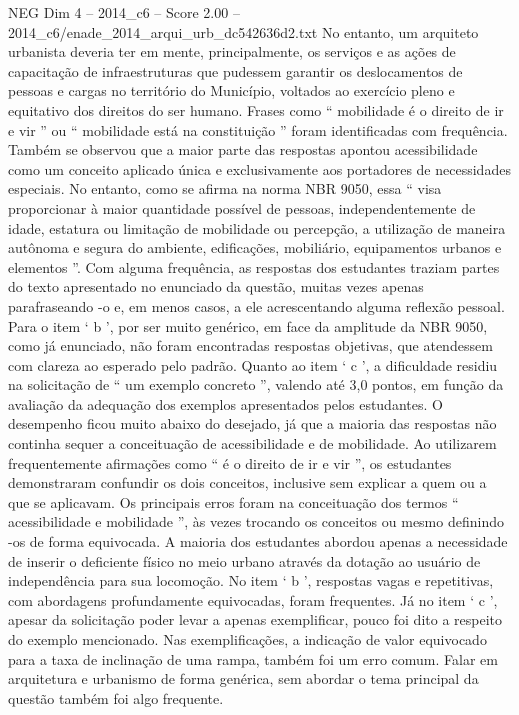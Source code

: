 \begin{textsample}{NEG Dim 4 – 2014\_c6 – Score 2.00 – 2014\_c6/enade\_2014\_arqui\_urb\_dc542636d2.txt}
No entanto, um arquiteto urbanista deveria ter em mente, principalmente, os serviços e as ações de capacitação de infraestruturas que pudessem garantir os deslocamentos de pessoas e cargas no território do Município, voltados ao exercício pleno e equitativo dos direitos do ser humano.
Frases como “ mobilidade é o direito de ir e vir ” ou “ mobilidade está na constituição ” foram identificadas com frequência.
Também se observou que a maior parte das respostas apontou acessibilidade como um conceito aplicado única e exclusivamente aos portadores de necessidades especiais.
No entanto, como se afirma na norma NBR 9050, essa “ visa proporcionar à maior quantidade possível de pessoas, independentemente de idade, estatura ou limitação de mobilidade ou percepção, a utilização de maneira autônoma e segura do ambiente, edificações, mobiliário, equipamentos urbanos e elementos ”.
Com alguma frequência, as respostas dos estudantes traziam partes do texto apresentado no enunciado da questão, muitas vezes apenas parafraseando -o e, em menos casos, a ele acrescentando alguma reflexão pessoal.
Para o item ‘ b ’, por ser muito genérico, em face da amplitude da NBR 9050, como já enunciado, não foram encontradas respostas objetivas, que atendessem com clareza ao esperado pelo padrão.
Quanto ao item ‘ c ’, a dificuldade residiu na solicitação de “ um exemplo concreto ”, valendo até 3,0 pontos, em função da avaliação da adequação dos exemplos apresentados pelos estudantes.
O desempenho ficou muito abaixo do desejado, já que a maioria das respostas não continha sequer a conceituação de acessibilidade e de mobilidade.
Ao utilizarem frequentemente afirmações como “ é o direito de ir e vir ”, os estudantes demonstraram confundir os dois conceitos, inclusive sem explicar a quem ou a que se aplicavam.
Os principais erros foram na conceituação dos termos “ acessibilidade e mobilidade ”, às vezes trocando os conceitos ou mesmo definindo -os de forma equivocada.
A maioria dos estudantes abordou apenas a necessidade de inserir o deficiente físico no meio urbano através da dotação ao usuário de independência para sua locomoção.
No item ‘ b ’, respostas vagas e repetitivas, com abordagens profundamente equivocadas, foram frequentes.
Já no item ‘ c ’, apesar da solicitação poder levar a apenas exemplificar, pouco foi dito a respeito do exemplo mencionado.
Nas exemplificações, a indicação de valor equivocado para a taxa de inclinação de uma rampa, também foi um erro comum.
Falar em arquitetura e urbanismo de forma genérica, sem abordar o tema principal da questão também foi algo frequente.

\end{textsample}
